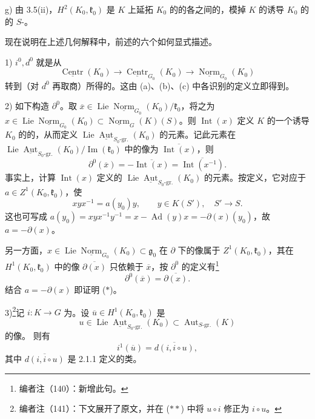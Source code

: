 g) 由 3.5(ii)，$H^2(K_0,\mathfrak k_0)$ 是 $K$ 上延拓 $K_0$ 的的各之间的，模掉 $K$ 的诱导 $K_0$ 的的 $S$-。

现在说明在上述几何解释中，前述的六个如何显式描述。

1) $i^0,d^0$ 就是从
\[\underline{\operatorname{Centr}}(K_0)\longrightarrow\underline{\operatorname{Centr}}_{G_0}(K_0)\longrightarrow\underline{\operatorname{Norm}}_{G_0}(K_0)\]
转到（对 $d^0$ 再取商）所得的。这由 (a)、(b)、(c) 中各识别的定义立即得到。

2) 如下构造 $\partial^0$。取 $\overline x\in\operatorname{Lie}\underline{\operatorname{Norm}}_{G_0}(K_0)/\mathfrak k_0$，将之为 $x\in\operatorname{Lie}\underline{\operatorname{Norm}}_{G_0}(K_0)\subset\underline{\operatorname{Norm}}_G(K)(S)$。则 $\operatorname{Int}(x)$ 定义 $K$ 的一个诱导 $K_0$ 的的，从而定义 $\operatorname{Lie}\underline{\operatorname{Aut}}_{S_0\text{-gr.}}(K_0)$ 的元素。记此元素在 $\operatorname{Lie}\underline{\operatorname{Aut}}_{S_0\text{-gr.}}(K_0)/\operatorname{Im}(\mathfrak k_0)$ 中的像为 $\overline{\operatorname{Int}(x)}$，则
\[\partial^0(\overline x)=-\overline{\operatorname{Int}(x)}=\overline{\operatorname{Int}(x^{-1})}.\tag{$*$}\]
事实上，计算 $\operatorname{Int}(x)$ 定义的 $\operatorname{Lie}\underline{\operatorname{Aut}}_{S_0\text{-gr.}}(K_0)$ 的元素。按定义，它对应于 $a\in Z^1(K_0,\mathfrak k_0)$，使
\[xyx^{-1}=a(y_0)y,\qquad y\in K(S'),\quad S'\longrightarrow S.\]
这也可写成 $a(y_0)=xyx^{-1}y^{-1}=x-\operatorname{Ad}(y)x=-\partial(x)(y_0)$，故 $a=-\partial(x)$。

另一方面，$x\in\operatorname{Lie}\underline{\operatorname{Norm}}_{G_0}(K_0)\subset\mathfrak g_0$ 在 $\partial$ 下的像属于 $Z^1(K_0,\mathfrak k_0)$，其在 $H^1(K_0,\mathfrak k_0)$ 中的像 $\overline{\partial(x)}$ 只依赖于 $\overline x$，按 $\partial^0$ 的定义有\footnote{编者注（140）：新增此句。}
\[\partial^0(\overline x)=\overline{\partial(x)}.\]
结合 $a=-\partial(x)$ 即证明 ($*$)。

3)\footnote{编者注（141）：下文展开了原文，并在 ($**$) 中将 $u\circ i$ 修正为 $i\circ u$。}记 $i:K\to G$ 为。设 $\overline u\in H^1(K_0,\mathfrak k_0)$ 是
\[u\in\operatorname{Lie}\underline{\operatorname{Aut}}_{S_0\text{-gr.}}(K_0)\subset\operatorname{Aut}_{S\text{-gr.}}(K)\]
的像。
则有
\[i^1(\overline u)=\overline{d(i,i\circ u)},\tag{$**$}\]
其中 $\overline{d(i,i\circ u)}$ 是 2.1.1 定义的类。

